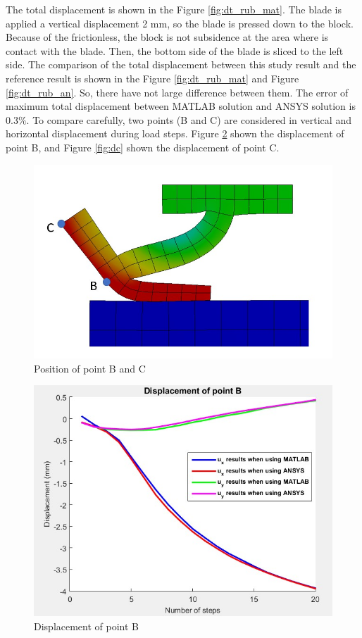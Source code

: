 The total displacement is shown in the Figure \ref{fig:dt_rub_mat}. The blade is applied a vertical
displacement 2 mm, so the blade is pressed down to the block. Because of the frictionless,
the block is not subsidence at the area where is contact with the blade. Then, the bottom
side of the blade is sliced to the left side.
\vspace{0.38cm} \newline
The comparison of the total displacement between this study result and the reference result
is shown in the Figure \ref{fig:dt_rub_mat} and Figure \ref{fig:dt_rub_an}. So, there have not large difference between them. 
The error of maximum total displacement between MATLAB solution and ANSYS solution is $0.3\%$.
\vspace{0.38cm} \newline
To compare carefully, two points (B and C) are considered in vertical and horizontal displacement during load steps.
Figure \ref{fig:disB} shown the displacement of point B, and Figure \ref{fig:dc}  shown the displacement of point C.
\begin{figure}[H]
    \centering
    \includegraphics[scale=0.75]{Figures/dbdc.jpg}
    \decoRule
    \caption{Position of point B and C}
    \label{fig:dbdc}
\end{figure} \noindent
\begin{figure}[H]
    \centering
    \includegraphics[scale=0.8]{Figures/disB.jpg}
    \decoRule
    \caption{Displacement of point B}
    \label{fig:disB}
\end{figure} \noindent
